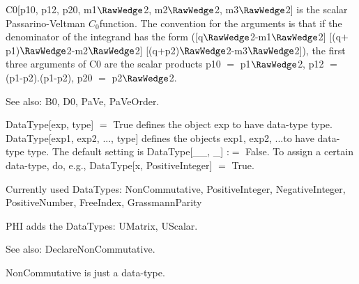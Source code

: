 

C0[p10, p12, p20, m1\(\RawWedge\)2, m2\(\RawWedge\)2, m3\(\RawWedge\)2] is the scalar Passarino-Veltman \({C_0}\)function. The convention for the
arguments is that if the denominator of the integrand has the form ([q\(\RawWedge\)2-m1\(\RawWedge\)2]
  [(q\(+\)p1)\(\RawWedge\)2-m2\(\RawWedge\)2] [(q\(+\)p2)\(\RawWedge\)2-m3\(\RawWedge\)2]), the first three arguments of C0 are the
  scalar products p10 \(=\) p1\(\RawWedge\)2, p12 \(=\) (p1-p2).(p1-p2), p20 \(=\) p2\(\RawWedge\)2.

See also:  B0, D0, PaVe, PaVeOrder.










DataType[exp, type] \(=\) True defines the object exp to have data-type type. DataType[exp1, exp2, ..., type] defines the objects exp1,
  exp2, ...to have data-type type. The default setting is DataType[\_{}\_{}, \_{}] :\(=\) False. To assign a certain data-type, do, e.g.,
  DataType[x, PositiveInteger] \(=\) True.

Currently used DataTypes: NonCommutative, PositiveInteger, NegativeInteger, PositiveNumber, FreeIndex, GrassmannParity

PHI adds the DataTypes: UMatrix, UScalar.

See also:  DeclareNonCommutative.


NonCommutative is just a data-type.

